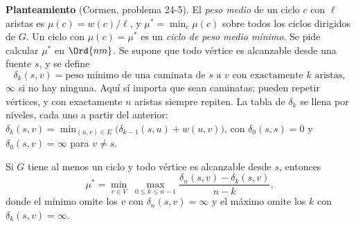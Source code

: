 \documentclass[11pt,letterpaper]{article}
\begin{document}
\textbf{Planteamiento} (Cormen, problema 24-5). El \emph{peso medio}
de un ciclo $c$ con $\ell$ aristas es $\mu(c) = w(c)/\ell$, y
$\mu^* = \min_c \mu(c)$ sobre todos los ciclos dirigidos de $G$. Un
ciclo con $\mu(c) = \mu^*$ es un \emph{ciclo de peso medio mínimo}.
Se pide calcular $\mu^*$ en $\Ord{nm}$. Se supone que todo vértice es
alcanzable desde una fuente $s$, y se define
\[
  \delta_k(s, v) = \text{peso mínimo de una caminata de } s
  \text{ a } v \text{ con exactamente } k \text{ aristas} ,
\]
$\infty$ si no hay ninguna. Aquí sí importa que sean caminatas: pueden
repetir vértices, y con exactamente $n$ aristas siempre repiten.
La tabla de $\delta_k$ se llena por niveles, cada uno a partir del
anterior:
$\delta_k(s, v) = \min_{(u, v) \in E} \bigl( \delta_{k-1}(s, u) +
w(u, v) \bigr)$, con $\delta_0(s, s) = 0$ y $\delta_0(s, v) = \infty$
para $v \ne s$.

\begin{teorema}[Karp]\label{teo:caminos-karp}
  Si $G$ tiene al menos un ciclo y todo vértice es alcanzable desde
  $s$, entonces
  \[
    \mu^* = \min_{v \in V} \; \max_{0 \le k \le n - 1}
      \frac{\delta_n(s, v) - \delta_k(s, v)}{n - k} ,
  \]
  donde el mínimo omite los $v$ con $\delta_n(s, v) = \infty$ y el
  máximo omite los $k$ con $\delta_k(s, v) = \infty$.
\end{teorema}
\end{document}
